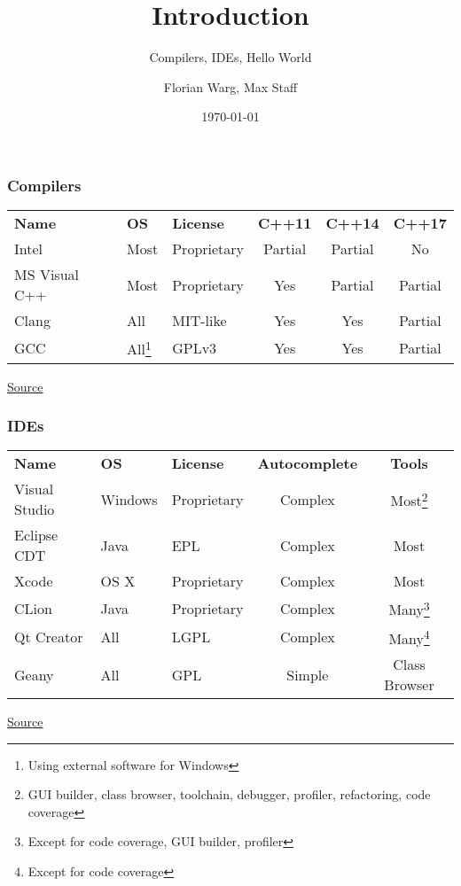 



\title{Introduction}
\subtitle{Compilers, IDEs, Hello World}
\date{\today}
\author{Florian Warg, Max Staff}

\maketitle

\begin{frame}[fragile]
    \frametitle{Compilers}
    \begin{tabular}{lllccc}
        \textbf{Name} & \textbf{OS} & \textbf{License} & \textbf{C++11} & \textbf{C++14} & \textbf{C++17} \\
        Intel & Most & Proprietary & Partial & Partial & No \\
        MS Visual C++ & Most & Proprietary & Yes & Partial & Partial \\
        Clang & All & MIT-like & Yes & Yes & Partial \\
        GCC & All\footnote{Using external software for Windows} & GPLv3 & Yes & Yes & Partial \\
    \end{tabular} \bigskip
    \href{https://en.wikipedia.org/wiki/List_of_compilers#C.2B.2B_compilers}{Source}
\end{frame}

\begin{frame}[fragile]
    \frametitle{IDEs}
    \begin{tabular}{lllcc}
        \textbf{Name} & \textbf{OS} & \textbf{License} & \textbf{Autocomplete} & \textbf{Tools} \\
        Visual Studio & Windows & Proprietary & Complex & Most\footnote{GUI builder, class browser, toolchain, debugger, profiler, refactoring, code coverage} \\
        Eclipse CDT & Java & EPL & Complex & Most\footnotemark[\value{footnote}] \\
        Xcode & OS X & Proprietary & Complex & Most\footnotemark[\value{footnote}] \\
        CLion & Java & Proprietary & Complex & Many\footnote{Except for code coverage, GUI builder, profiler} \\
        Qt Creator & All & LGPL & Complex & Many\footnote{Except for code coverage} \\
        Geany & All & GPL & Simple & \footnotesize{Class Browser} \\
    \end{tabular} \bigskip
    \href{https://en.wikipedia.org/wiki/Comparison_of_integrated_development_environments#C.2FC.2B.2B}{Source}
\end{frame}

